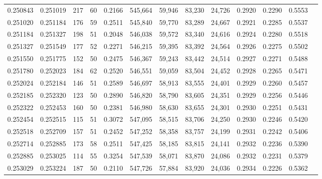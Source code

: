 \begin{tabular}{rrrrrrrrrrrrr}
0.250843 & 0.251019 &   217 &  60 &                                     0.2166 & 545,664 &  59,946 &  83,230 &  24,726 & 0.2920 & 0.2290 & 0.5553 \\
0.251020 & 0.251184 &   176 &  59 &                                     0.2511 & 545,840 &  59,770 &  83,289 &  24,667 & 0.2921 & 0.2285 & 0.5537 \\
0.251184 & 0.251327 &   198 &  51 &                                     0.2048 & 546,038 &  59,572 &  83,340 &  24,616 & 0.2924 & 0.2280 & 0.5518 \\
0.251327 & 0.251549 &   177 &  52 &                                     0.2271 & 546,215 &  59,395 &  83,392 &  24,564 & 0.2926 & 0.2275 & 0.5502 \\
0.251550 & 0.251775 &   152 &  50 &                                     0.2475 & 546,367 &  59,243 &  83,442 &  24,514 & 0.2927 & 0.2271 & 0.5488 \\
0.251780 & 0.252023 &   184 &  62 &                                     0.2520 & 546,551 &  59,059 &  83,504 &  24,452 & 0.2928 & 0.2265 & 0.5471 \\
0.252024 & 0.252184 &   146 &  51 &                                     0.2589 & 546,697 &  58,913 &  83,555 &  24,401 & 0.2929 & 0.2260 & 0.5457 \\
0.252185 & 0.252320 &   123 &  50 &                                     0.2890 & 546,820 &  58,790 &  83,605 &  24,351 & 0.2929 & 0.2256 & 0.5446 \\
0.252322 & 0.252453 &   160 &  50 &                                     0.2381 & 546,980 &  58,630 &  83,655 &  24,301 & 0.2930 & 0.2251 & 0.5431 \\
0.252454 & 0.252515 &   115 &  51 &                                     0.3072 & 547,095 &  58,515 &  83,706 &  24,250 & 0.2930 & 0.2246 & 0.5420 \\
0.252518 & 0.252709 &   157 &  51 &                                     0.2452 & 547,252 &  58,358 &  83,757 &  24,199 & 0.2931 & 0.2242 & 0.5406 \\
0.252714 & 0.252885 &   173 &  58 &                                     0.2511 & 547,425 &  58,185 &  83,815 &  24,141 & 0.2932 & 0.2236 & 0.5390 \\
0.252885 & 0.253025 &   114 &  55 &                                     0.3254 & 547,539 &  58,071 &  83,870 &  24,086 & 0.2932 & 0.2231 & 0.5379 \\
0.253029 & 0.253224 &   187 &  50 &                                     0.2110 & 547,726 &  57,884 &  83,920 &  24,036 & 0.2934 & 0.2226 & 0.5362 \\

\end{tabular}
